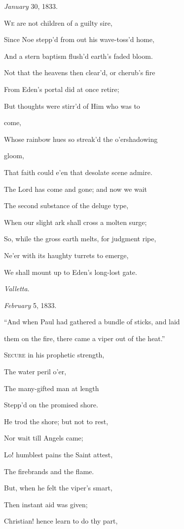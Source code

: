 \emph{January} 30, 1833.


W\textsc{e} are not children of a guilty sire,

Since Noe stepp'd from out his wave-toss'd
home,

And a stern baptism flush'd earth's faded
bloom.

Not that the heavens then clear'd, or cherub's fire

From Eden's portal did at once retire;

But thoughts were stirr'd of Him who was to

come,

Whose rainbow hues so streak'd the o'ershadowing

gloom,

That faith could e'en that desolate scene admire.

The Lord has come and gone; and now we wait

The second substance of the deluge type,

When our slight ark shall cross a molten surge;

So, while the gross earth melts, for judgment ripe,

Ne'er with its haughty turrets to emerge,

We shall mount up to Eden's long-lost gate.

\emph{Valletta}.

\emph{February} 5, 1833.


``And when Paul had gathered a bundle of
sticks, and laid

them on the fire, there came a viper out of the heat.''

S\textsc{ecure} in his prophetic strength,

The water peril o'er,

The many-gifted man at length

Stepp'd on the promised shore.

He trod the shore; but not to rest,

Nor wait till Angels came;

Lo! humblest pains the Saint attest,

The firebrands and the flame.

But, when he felt the viper's smart,

Then instant aid was given;

Christian! hence learn to do thy part,

